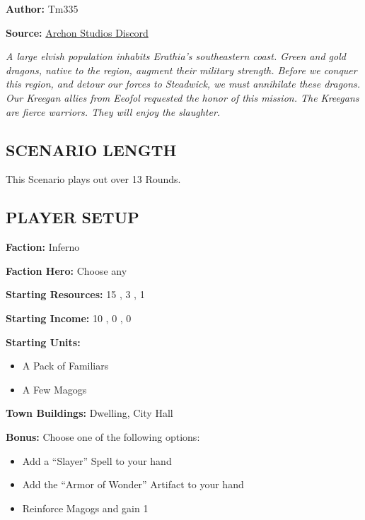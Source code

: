 \cleardoublepage{}

\begin{multicols*}{2}

\textbf{Author:} Tm335

\textbf{Source:} \href{https://discord.com/channels/740870068178649108/1243057664666238996/1243057664666238996}{Archon Studios Discord}

\textit{A large elvish population inhabits Erathia's southeastern coast.
Green and gold dragons, native to the region, augment their military strength.
Before we conquer this region, and detour our forces to Steadwick, we must annihilate these dragons.
Our Kreegan allies from Eeofol requested the honor of this mission.
The Kreegans are fierce warriors.
They will enjoy the slaughter.
}

\subsection*{\MakeUppercase{Scenario Length}}

This Scenario plays out over 13 Rounds.

\subsection*{\MakeUppercase{Player Setup}}

\textbf{Faction:} Inferno

\textbf{Faction Hero:} Choose any

\textbf{Starting Resources:} 15 , 3 , 1 

\textbf{Starting Income:} 10 , 0 , 0 

\textbf{Starting Units:}

\begin{itemize}
  \item A Pack of Familiars
  \item A Few Magogs
\end{itemize}

\textbf{Town Buildings:}  Dwelling, City Hall

\textbf{Bonus:} Choose one of the following options:
\begin{itemize}
  \item Add a ``Slayer'' Spell to your hand
  \item Add the ``Armor of Wonder'' Artifact to your hand
  \item Reinforce Magogs and gain 1 
\end{itemize}


\end{multicols*}
